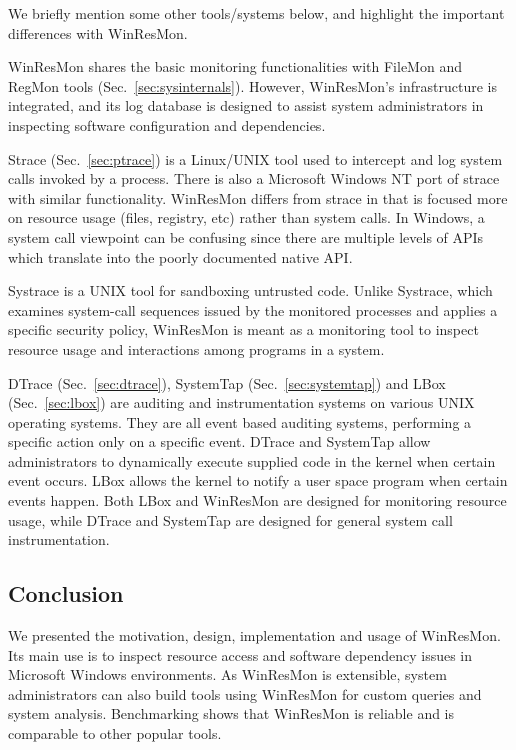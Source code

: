 We briefly mention some other tools/systems below, and highlight the important
differences with WinResMon.

WinResMon shares the basic monitoring functionalities with
FileMon and RegMon tools (Sec.~\ref{sec:sysinternals}).
However, WinResMon's
infrastructure is integrated, and its log database is designed to assist
system administrators in inspecting software configuration and dependencies.

Strace (Sec.~\ref{sec:ptrace}) is a Linux/UNIX tool used to intercept and log system
calls invoked by a process.  There is also a Microsoft Windows NT port of
strace with similar functionality.  WinResMon differs from
strace in that is focused more on resource usage (files, registry, etc) rather
than system calls.  In Windows, a system call viewpoint can be
confusing since there are multiple levels of APIs which translate into the poorly
documented native API.

Systrace \cite{provos2003improving} is a UNIX tool for sandboxing untrusted code.  Unlike
Systrace, which examines system-call sequences issued by the monitored
processes and applies a specific security policy, WinResMon is meant as a
monitoring tool to inspect resource usage and interactions among programs in a
system.

DTrace (Sec.~\ref{sec:dtrace}),
SystemTap (Sec.~\ref{sec:systemtap}) and
LBox (Sec.~\ref{sec:lbox}) are
auditing and instrumentation systems on various UNIX operating systems.  They
are all event based auditing systems, performing a specific action only on a
specific event.  DTrace and SystemTap allow administrators to dynamically
execute supplied code in the kernel when certain event occurs.  LBox allows
the kernel to notify a user space program when certain events happen.  Both
LBox and WinResMon are designed for monitoring resource usage, while DTrace and
SystemTap are designed for general system call instrumentation.


\subsection{Conclusion}

We presented the motivation, design, implementation and usage of
WinResMon.  Its main use is to inspect resource access and software dependency
issues in Microsoft Windows environments.  As WinResMon is extensible, system
administrators can also build tools using WinResMon for custom queries and
system analysis.  Benchmarking shows that WinResMon is reliable and is
comparable to other popular tools.

